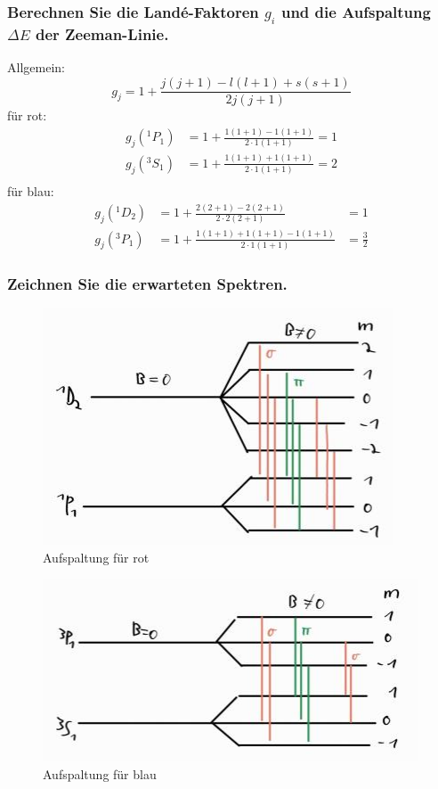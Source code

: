 \subsubsection[]{Berechnen Sie die Landé-Faktoren $g_i$ und die Aufspaltung $\Delta E$ der Zeeman-Linie.}
Allgemein:
\begin{equation*}
    g_j=1+\frac{j(j+1)-l(l+1)+s(s+1)}{2j(j+1)}
\end{equation*}
für rot:
\begin{align*}
    g_j(^1P_1)&=1+\frac{1(1+1)-1(1+1)}{2\cdot 1(1+1)}=1\\
    g_j(^3S_1)&=1+\frac{1(1+1)+1(1+1)}{2\cdot 1(1+1)}=2\\
\end{align*}
für blau:
\begin{align*}
    g_j(^1D_2)&=1+\frac{2(2+1)-2(2+1)}{2\cdot 2(2+1)}        &=1\\
    g_j(^3P_1)&=1+\frac{1(1+1)+1(1+1)-1(1+1)}{2\cdot 1(1+1)} &=\frac{3}{2}
\end{align*}

\subsubsection{Zeichnen Sie die erwarteten Spektren.}
\begin{figure}[H] 
    \centering
    \includegraphics[scale=0.7]{pictures/Aufspaltung_rot.png}
    \caption{Aufspaltung für rot}
\end{figure}
\begin{figure}[H] 
    \centering
    \includegraphics[scale=0.7]{pictures/Aufspaltung_blau.png}
    \caption{Aufspaltung für blau}
\end{figure}

